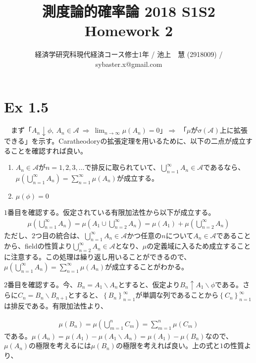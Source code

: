 \documentclass{article}
\begin{document}
\title{測度論的確率論 2018 S1S2 \\ 
Homework 2}
\author{経済学研究科現代経済コース修士1年 / 池上　慧 (2918009) / sybaster.x@gmail.com}
\maketitle

\section{Ex 1.5}
　まず「$A_n \downarrow \phi,\ A_n \in \mathcal{A}\ \Rightarrow\ \lim_{n \to \infty} \mu \left( A_n \right) = 0$」$\Rightarrow$ 「$\mu$が$\sigma\left( \mathcal{A} \right)$上に拡張できる」を示す。Caratheodoryの拡張定理を用いるために、以下の二点が成立することを確認すれば良い。
\begin{enumerate}
	\item $A_n \in \mathcal{A}$が$n = 1,2,3,\dots$で排反に取られていて、$\bigcup_{n = 1}^{\infty} A_n \in \mathcal{A}$であるなら、$\mu \left( \bigcup_{n = 1}^{\infty} A_n \right) = \sum_{n = 1}^{\infty} \mu \left( A_n \right)$が成立する。
	\item $\mu(\phi) = 0$
\end{enumerate}

$1$番目を確認する。仮定されている有限加法性から以下が成立する。
\begin{align*}
	\mu \left(  \bigcup_{n = 1}^{\infty} A_n \right) = \mu \left( A_1 \cup  \bigcup_{n = 2}^{\infty} A_n \right) = \mu \left( A_1 \right) + \mu \left( \bigcup_{n = 2}^{\infty} A_n \right)
\end{align*}
ただし、$2$つ目の統合は、$\bigcup_{n = 1}^{\infty} A_n \in \mathcal{A}$かつ任意の$n$について$A_n \in \mathcal{A}$であることから、fieldの性質より$ \bigcup_{n = 2}^{\infty} A_n \in \mathcal{A}$となり、$\mu$の定義域に入るため成立することに注意する。この処理は繰り返し用いることができるので、$\mu \left( \bigcup_{n = 1}^{\infty} A_n \right) = \sum_{n = 1}^{\infty} \mu \left( A_n \right)$が成立することがわかる。

$2$番目を確認する。今、$B_n = A_1 \backslash A_n$とすると、仮定より$B_n \uparrow A_1 \backslash \phi$である。さらに$C_n = B_n \backslash B_{n+ 1}$とすると、$\left\{ B_n \right\}_{n = 1}^{\infty}$が単調な列であることから$\left\{ C_n \right\}_{n = 1}^{\infty}$は排反である。有限加法性より、

\begin{align*}
	\mu \left( B_n \right) = \mu \left( \bigcup_{m = 1}^n C_m \right) = \sum_{m = 1}^n \mu \left( C_m \right)
\end{align*}
である。$\mu\left( A_n \right) = \mu \left( A_1 \right) - \mu \left( A_1 \backslash A_n \right) = \mu \left( A_1 \right) - \mu \left( B_n \right)$なので、$\mu \left( A_n \right)$の極限を考えるには$\mu \left( B_n \right)$の極限を考えれば良い。上の式と$1$の性質より、
\end{document}
